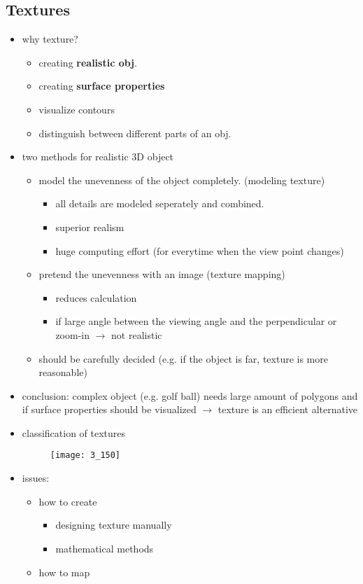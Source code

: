 \documentclass{standalone}
\begin{document}
\subsection{Textures}

\begin{itemize}
	\item why texture? 
		\begin{itemize}
			\item creating \textbf{realistic obj}.
			\item creating \textbf{surface properties}
			\item visualize contours
			\item distinguish between different parts of an obj.
		\end{itemize}
	\item two methods for realistic 3D object
		\begin{itemize}
			\item model the unevenness of the object completely. (modeling texture)
				\begin{itemize}
					\item all details are modeled seperately and combined. 
					\item superior realism
					\item huge computing effort (for everytime when the view point changes)
				\end{itemize}
			\item pretend the unevenness with an image (texture mapping)
				\begin{itemize}
					\item reduces calculation
					\item if large angle between the viewing angle and the perpendicular or zoom-in $\rightarrow$ not realistic
				\end{itemize}
			\item should be carefully decided (e.g. if the object is far, texture is more reasonable)
		\end{itemize} 
	\item conclusion: complex object (e.g. golf ball) needs large amount of polygons and if surface properties should be visualized $\rightarrow$ texture is an efficient alternative
	\item classification of textures
		\begin{figure}
			\texttt{[image: 3\_150]}
		\end{figure}
	\item issues:
		\begin{itemize}
			\item how to create
				\begin{itemize}
					\item designing texture manually
					\item mathematical methods
				\end{itemize}
			\item how to map
		\end{itemize}
\end{itemize}
\end{document}
